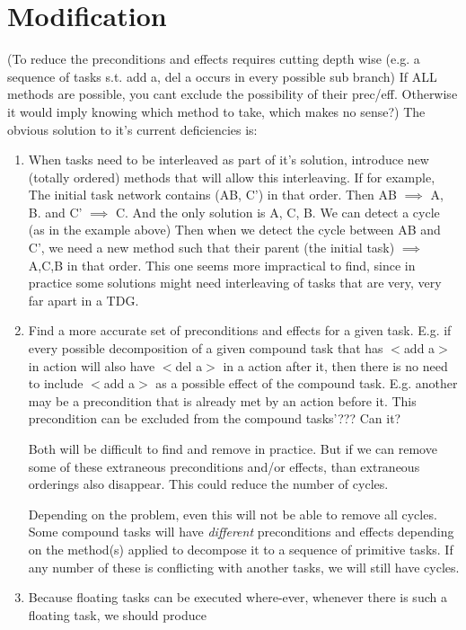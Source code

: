 \section{Modification}
(To reduce the preconditions and effects requires cutting depth wise (e.g. a sequence of tasks s.t.  add a, del a occurs in every possible sub branch)
If ALL methods are possible, you cant exclude the possibility of their prec/eff. Otherwise it would imply knowing which method to take, which makes no sense?)
The obvious solution to it's current deficiencies is: 
\begin{enumerate}
	\item When tasks need to be interleaved as part of it's solution, introduce new (totally ordered) methods that will allow this interleaving.
	If for example, The initial task network contains (AB, C') in that order. Then AB $\implies$ A, B.  and C' $\implies$ C.
	And the only solution is A, C, B. We can detect a cycle (as in the example above)
	Then when we detect the cycle between AB and C', we need a new method such that their parent (the initial task) $\implies$ A,C,B  in that order.  This one seems more impractical to find,
	since in practice some solutions might need interleaving of tasks that are very, very far apart in a TDG.
	
	\item Find a more accurate set of preconditions and effects for a given task.  
	E.g. if every possible decomposition of a given compound task that has $<$add a$>$ in action will also have $<$del a$>$ in a action after it, 
	then there is no need to include $<$add a$>$ as a possible effect of the compound task.
	E.g. another may be a precondition that is already met by an action before it. This precondition can be excluded from the compound tasks'??? Can it?
	
	
	Both will be difficult to find and remove in practice. But if we can remove some of these extraneous preconditions and/or effects, than extraneous orderings also disappear. This could reduce the number
	of cycles.
	
	Depending on the problem, even this will not be able to remove all cycles.  Some compound tasks will have \emph{different} 
	preconditions and effects depending	on the method(s) applied to decompose it to a sequence of primitive tasks. If any number of
	these is conflicting with another tasks, we will still have cycles.
	
	\item Because floating tasks can be executed where-ever, whenever there is such a floating task, we should produce
		
\end{enumerate}